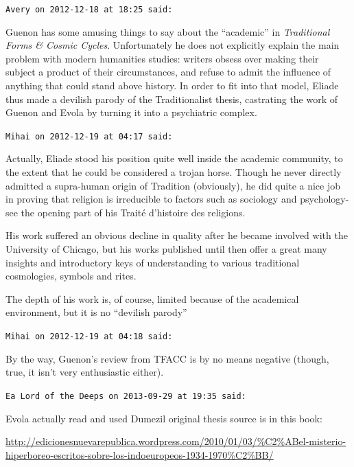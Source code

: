 \begin{footnotesize}
\begin{sffamily}
\texttt{Avery on 2012-12-18 at 18:25 said:}

Guenon has some amusing things to say about the ``academic'' in \emph{Traditional Forms \& Cosmic Cycles}. Unfortunately he does not explicitly explain the main problem with modern humanities studies: writers obsess over making their subject a product of their circumstances, and refuse to admit the influence of anything that could stand above history. In order to fit into that model, Eliade thus made a devilish parody of the Traditionalist thesis, castrating the work of Guenon and Evola by turning it into a psychiatric complex.

\hfill

\texttt{Mihai on 2012-12-19 at 04:17 said:}

Actually, Eliade stood his position quite well inside the academic community, to the extent that he could be considered a trojan horse. Though he never directly admitted a supra-human origin of Tradition (obviously), he did quite a nice job in proving that religion is irreducible to factors such as sociology and psychology- see the opening part of his Traité d'histoire des religions.

His work suffered an obvious decline in quality after he became involved with the University of Chicago, but his works published until then offer a great many insights and introductory keys of understanding to various traditional cosmologies, symbols and rites.

The depth of his work is, of course, limited because of the academical environment, but it is no ``devilish parody''

\hfill

\texttt{Mihai on 2012-12-19 at 04:18 said:}

By the way, Guenon's review from TFACC is by no means negative (though, true, it isn't very enthusiastic either).

\hfill

\texttt{Ea Lord of the Deeps on 2013-09-29 at 19:35 said:}

Evola actually read and used Dumezil original thesis source is in this book:

\url{http://edicionesnuevarepublica.wordpress.com/2010/01/03/\%C2\%ABel-misterio-hiperboreo-escritos-sobre-los-indoeuropeos-1934-1970\%C2\%BB/}

\hfill

\end{sffamily}
\end{footnotesize}

